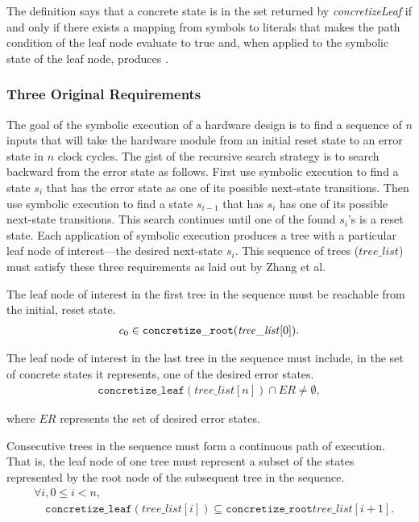 The definition says that a concrete state \concstate{} is in the set returned by
\emph{concretizeLeaf} if and only if there exists a mapping from symbols to
literals that makes the path condition of the leaf node evaluate to true and,
when applied to the symbolic state of the leaf node, produces \concstate{}.

\subsubsection{Three Original Requirements} The goal of the symbolic execution
of a hardware design is to find a sequence of $n$ inputs that will take the hardware
module from an initial reset state to an error state in $n$ clock cycles. The
gist of the recursive search strategy is to search backward from the error
state as follows. First use symbolic execution to find a state $s_i$ that has the error
state as one of its possible next-state transitions. Then use symbolic execution
to find a state $s_{i-1}$ that has $s_i$ has one of its possible next-state
transitions. This search continues until one of the found $s_i$'s is a reset
state. Each application of symbolic execution produces a tree with a particular
leaf node of interest---the desired next-state $s_i$. This sequence of trees ($\mathit{tree\_list}$)
must satisfy these three requirements as laid out by Zhang et al.
\setcounter{property}{0}
\renewcommand{\theproperty}{Z.\arabic{property}}
\begin{property}
  \label{prop:startinit} The leaf node of interest in the first tree in the
  sequence must be reachable from the initial, reset state.
  \begin{align*}
    c_0 \in \mathtt{concretize\_root}(\mathit{tree\_list}[0]).
  \end{align*}
\end{property}

\begin{property}
  \label{prop:enderror} The leaf node of interest in the last tree in the
  sequence must include, in the set of concrete states it represents, one of the
  desired error states. 
  \begin{align*}
    \mathtt{concretize\_leaf}(\mathit{tree\_list}[n]) \cap \mathit{ER} \neq
    \emptyset,
  \end{align*}
\end{property}
where $\mathit{ER}$ represents the set of desired error states.

\begin{property}
  \label{prop:stitch}
  Consecutive trees in the sequence must form a continuous path of
  execution. That is, the leaf node of one tree must represent a subset of the
  states represented by the root node of the subsequent tree in the sequence.
  \begin{align*}
    &\forall i, 0 \le i < n,\\
    &\quad\mathtt{concretize\_leaf}(\mathit{tree\_list}[i]) \subseteq
\mathtt{concretize\_root}\mathit{tree\_list}[i+1].
\end{align*}

\end{property}

